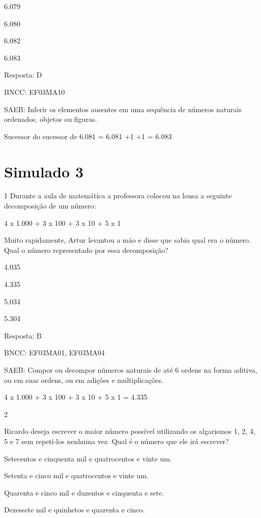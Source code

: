 \begin{escolha}
{\begin{escolha}
{\begin{escolha}
\item
  6.079
\item
  6.080
\item
  6.082
\item
  6.083
\end{escolha}

Resposta: D

BNCC: EF03MA10

SAEB: Inferir os elementos ausentes em uma sequência de números naturais ordenados, objetos ou figuras.

Sucessor do sucessor de 6.081 = 6.081 +1 +1 = 6.083

\chapter{Simulado 3}

\num{1} Durante a aula de matemática a professora colocou na lousa
a seguinte decomposição de um número:

4 x 1.000 + 3 x 100 + 3 x 10 + 5 x 1

Muito rapidamente, Artur levantou a mão e disse que sabia qual era o número. Qual o número representado por essa decomposição?

\begin{escolha}
\item
  4.035
\item
  4.335
\item
  5.034
\item
  5.304
\end{escolha}

Resposta: B

BNCC: EF03MA01, EF03MA04

SAEB: Compor ou decompor números naturais de até 6 ordens na forma aditiva, ou em suas ordens, ou em adições e multiplicações.

4 x 1.000 + 3 x 100 + 3 x 10 + 5 x 1 = 4.335

\num{2}

Ricardo deseja escrever o maior número possível utilizando
os algarismos 1, 2, 4, 5 e 7 sem repeti-los nenhuma vez. Qual é o número que ele irá escrever?

\begin{escolha}
\item
  Setecentos e cinquenta mil e quatrocentos e vinte um.
\item
  Setenta e cinco mil e quatrocentos e vinte um.
\item
  Quarenta e cinco mil e duzentos e cinquenta e sete.
\item
  Dezessete mil e quinhetos e quarenta e cinco.
\end{escolha}

}
\end{escolha}}
\end{escolha}
